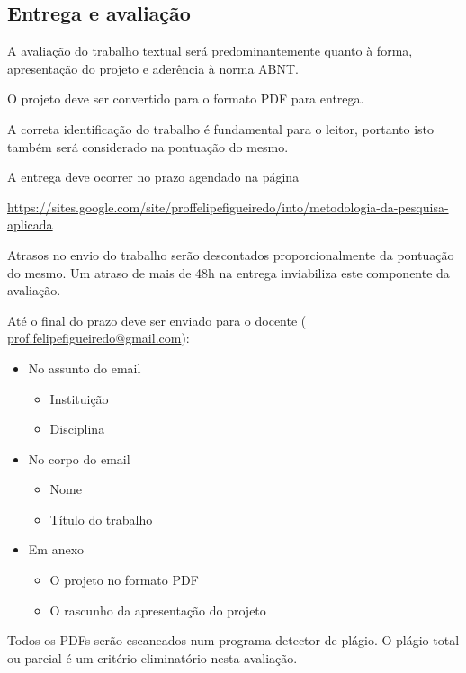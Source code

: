 \documentclass[a4paper]{article}
\begin{document}

\subsection{Entrega e avaliação}

A avaliação do trabalho textual será predominantemente quanto à forma, apresentação do projeto e aderência à norma ABNT.

O projeto deve ser convertido para o formato PDF para entrega.

A correta identificação do trabalho é fundamental para o leitor, portanto isto também será considerado na pontuação do mesmo.

A entrega deve ocorrer no prazo agendado na página

\url{https://sites.google.com/site/proffelipefigueiredo/into/metodologia-da-pesquisa-aplicada}

Atrasos no envio do trabalho serão descontados proporcionalmente da pontuação do mesmo.
Um atraso de mais de 48h na entrega inviabiliza este componente da avaliação.

Até o final do prazo deve ser enviado para o docente (  \url{prof.felipefigueiredo@gmail.com}):
\begin{itemize}
\item No assunto do email
  \begin{itemize}
  \item Instituição
  \item Disciplina
  \end{itemize}
\item No corpo do email
  \begin{itemize}
  \item Nome
  \item Título do trabalho
  \end{itemize}
\item Em anexo
  \begin{itemize}
  \item O projeto no formato PDF
  \item O rascunho da apresentação do projeto
  \end{itemize}
\end{itemize}

Todos os PDFs serão escaneados num programa detector de plágio.
O plágio total ou parcial é um critério eliminatório nesta avaliação.
\end{document}
